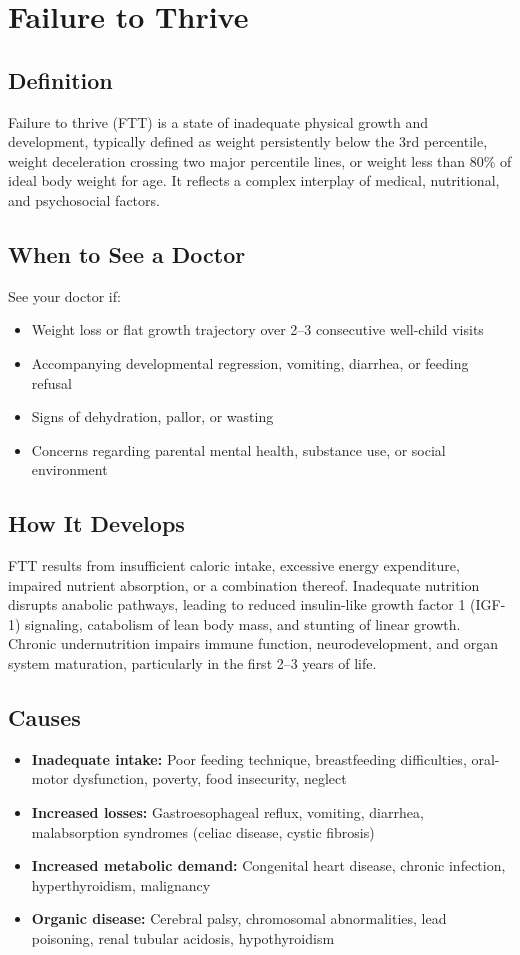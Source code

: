 \chapter{Failure to Thrive}

\section*{Definition}
Failure to thrive (FTT) is a state of inadequate physical growth and development, typically defined as weight persistently below the 3rd percentile, weight deceleration crossing two major percentile lines, or weight less than 80\% of ideal body weight for age. It reflects a complex interplay of medical, nutritional, and psychosocial factors.

\section*{When to See a Doctor}
See your doctor if:
\begin{itemize}
  \item Weight loss or flat growth trajectory over 2--3 consecutive well-child visits
  \item Accompanying developmental regression, vomiting, diarrhea, or feeding refusal
  \item Signs of dehydration, pallor, or wasting
  \item Concerns regarding parental mental health, substance use, or social environment
\end{itemize}

\section*{How It Develops}
FTT results from insufficient caloric intake, excessive energy expenditure, impaired nutrient absorption, or a combination thereof. Inadequate nutrition disrupts anabolic pathways, leading to reduced insulin-like growth factor 1 (IGF-1) signaling, catabolism of lean body mass, and stunting of linear growth. Chronic undernutrition impairs immune function, neurodevelopment, and organ system maturation, particularly in the first 2--3 years of life.

\section*{Causes}
\begin{itemize}
  \item \textbf{Inadequate intake:} Poor feeding technique, breastfeeding difficulties, oral-motor dysfunction, poverty, food insecurity, neglect
  \item \textbf{Increased losses:} Gastroesophageal reflux, vomiting, diarrhea, malabsorption syndromes (celiac disease, cystic fibrosis)
  \item \textbf{Increased metabolic demand:} Congenital heart disease, chronic infection, hyperthyroidism, malignancy
  \item \textbf{Organic disease:} Cerebral palsy, chromosomal abnormalities, lead poisoning, renal tubular acidosis, hypothyroidism
\end{itemize}

